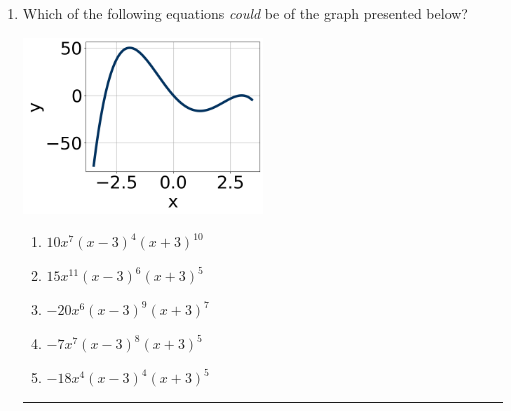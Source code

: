 \documentclass[14pt]{extbook}
\newcommand{\litem}[1]{\item#1\hspace*{-1cm}\rule{\textwidth}{0.4pt}}
\begin{document}
\begin{enumerate}
{\begin{enumerate}[label=\Alph*.]
\end{enumerate} }
\litem{
Which of the following equations \textit{could} be of the graph presented below?
\begin{center}
    \includegraphics[width=0.5\textwidth]{../Figures/polyGraphToFunctionCopyA.png}
\end{center}
\begin{enumerate}[label=\Alph*.]
\item \( 10x^{7} (x - 3)^{4} (x + 3)^{10} \)
\item \( 15x^{11} (x - 3)^{6} (x + 3)^{5} \)
\item \( -20x^{6} (x - 3)^{9} (x + 3)^{7} \)
\item \( -7x^{7} (x - 3)^{8} (x + 3)^{5} \)
\item \( -18x^{4} (x - 3)^{4} (x + 3)^{5} \)


\end{enumerate}}
\end{enumerate}
\end{document}
